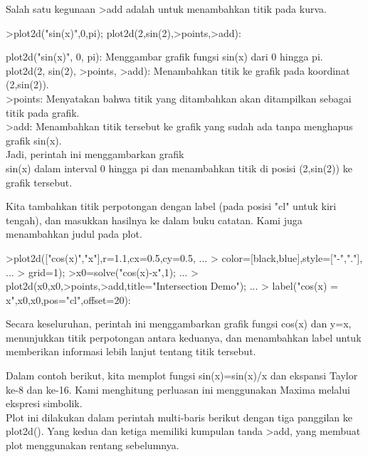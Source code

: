 \documentclass{article}
\begin{document}
\begin{eulernotebook}
\begin{eulercomment}
\begin{eulercomment}
\begin{eulercomment}
\begin{eulercomment}
\begin{eulercomment}
\begin{eulercomment}
\begin{eulercomment}
\begin{eulercomment}
\begin{eulercomment}
Salah satu kegunaan \textgreater{}add adalah untuk menambahkan titik pada kurva.
\end{eulercomment}
\begin{eulerprompt}
>plot2d("sin(x)",0,pi); plot2d(2,sin(2),>points,>add):
\end{eulerprompt}
\begin{eulercomment}
plot2d("sin(x)", 0, pi): Menggambar grafik fungsi sin(x) dari 0 hingga
pi.\\
plot2d(2, sin(2), \textgreater{}points, \textgreater{}add): Menambahkan titik ke grafik pada
koordinat (2,sin(2)).\\
\textgreater{}points: Menyatakan bahwa titik yang ditambahkan akan ditampilkan
sebagai titik pada grafik.\\
\textgreater{}add: Menambahkan titik tersebut ke grafik yang sudah ada tanpa
menghapus grafik sin(x).\\
Jadi, perintah ini menggambarkan grafik\\
sin(x) dalam interval 0 hingga pi dan menambahkan titik di posisi
(2,sin(2)) ke grafik tersebut.

Kita tambahkan titik perpotongan dengan label (pada posisi "cl" untuk
kiri tengah), dan masukkan hasilnya ke dalam buku catatan. Kami juga
menambahkan judul pada plot.
\end{eulercomment}
\begin{eulerprompt}
>plot2d(["cos(x)","x"],r=1.1,cx=0.5,cy=0.5, ...
>  color=[black,blue],style=["-","."], ...
>  grid=1);
>x0=solve("cos(x)-x",1);  ...
>  plot2d(x0,x0,>points,>add,title="Intersection Demo");  ...
>  label("cos(x) = x",x0,x0,pos="cl",offset=20):
\end{eulerprompt}
\begin{eulercomment}
Secara keseluruhan, perintah ini menggambarkan grafik fungsi cos(x)
dan y=x, menunjukkan titik perpotongan antara keduanya, dan
menambahkan label untuk memberikan informasi lebih lanjut tentang
titik tersebut.

Dalam contoh berikut, kita memplot fungsi sin(x)=sin(x)/x dan ekspansi
Taylor ke-8 dan ke-16. Kami menghitung perluasan ini menggunakan
Maxima melalui ekspresi simbolik.\\
Plot ini dilakukan dalam perintah multi-baris berikut dengan tiga
panggilan ke plot2d(). Yang kedua dan ketiga memiliki kumpulan tanda
\textgreater{}add, yang membuat plot menggunakan rentang sebelumnya.


\end{eulercomment}
\end{eulercomment}
\end{eulercomment}
\end{eulercomment}
\end{eulercomment}
\end{eulercomment}
\end{eulercomment}
\end{eulercomment}
\end{eulercomment}
\end{eulernotebook}
\end{document}
